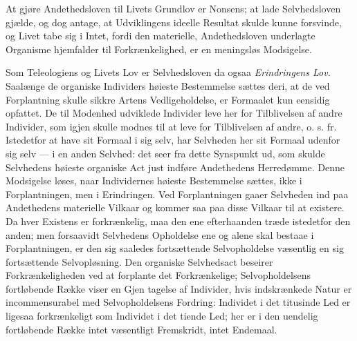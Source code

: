 \documentclass[11pt]{book}
\newcommand{\opage}[1]{\marginnote{\footnotesize\textit{[#1]}}}
\begin{document}
At gjøre Andethedsloven til Livets Grundlov er Nonsens; at lade
Selvhedsloven gjælde, og dog antage, at Udviklingens ideelle Resultat skulde
kunne forsvinde, og Livet tabe sig i Intet, fordi den materielle,
Andethedsloven underlagte Organisme hjemfalder til Forkrænkelighed, er en
meningsløs Modsigelse.

Som Teleologiens og Livets Lov er Selvhedsloven da ogsaa \emph{Erindringens
Lov.} Saalænge de organiske Individers høieste Bestemmelse sættes deri, at
de ved Forplantning skulle sikkre Artens Vedligeholdelse, er Formaalet kun
eensidig opfattet. De til Modenhed udviklede Individer leve her for
Tilblivelsen af andre Individer, som igjen skulle modnes til at leve for
Tilblivelsen af andre, o. s. fr. Istedetfor at have sit Formaal i sig selv,
har Selvheden her sit Formaal udenfor sig selv --- i en anden Selvhed: det
seer fra dette Synspunkt ud, som skulde Selvhedens høieste organiske Act
just indføre Andethedens Herredømme. Denne Modsigelse løses, naar
Individernes høieste Bestemmelse sættes, ikke i Forplantningen, men i
Erindringen. Ved Forplantningen gaaer Selvheden ind paa Andethedens
materielle Vilkaar og kommer saa paa disse Vilkaar til at existere. Da hver
Existens er forkrænkelig, maa den ene efterhaanden træde istedetfor den
anden; men forsaavidt Selvhedens Opholdelse ene og alene skal bestaae i
Forplantningen, er den sig saaledes fortsættende Selvopholdelse væsentlig en
sig fortsættende Selvopløsning. Den organiske Selvhedsact beseirer
Forkrænkeligheden ved at forplante det Forkrænkelige; Selvopholdelsens
fortløbende Række viser en Gjen\-%
\opage{283} \setcounter{footnote}{0}%
tagelse af Individer, hvis indskrænkede Natur er incommensurabel med
Selvopholdelsens Fordring: Individet i det titusinde Led er ligesaa
forkrænkeligt som Individet i det tiende Led; her er i den uendelig
fortløbende Række intet væsentligt Fremskridt, intet Endemaal.
\end{document}
